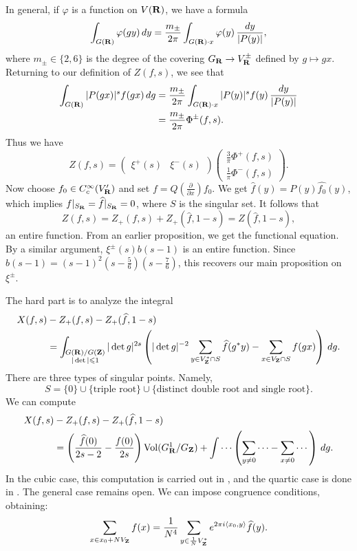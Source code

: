 In general, if $\varphi$ is a function on $V(\mathbf{R})$, we have a formula 
\[
  \int_{G(\mathbf{R})} \varphi(g y)\, dy = \frac{m_\pm}{2\pi} \int_{G(\mathbf{R})\cdot x} \varphi(y)\, \frac{dy}{|P(y)|} ,
\]
where $m_\pm\in \{2,6\}$ is the degree of the covering $G_{\mathbf{R}} \to V_{\mathbf{R}}^\pm$ 
defined by $g\mapsto g x$. Returning to our definition of $Z(f,s)$, we see that 
\begin{align*}
  \int_{G(\mathbf{R})} |P(g x)|^s f(g x)\, dg 
    &= \frac{m_\pm}{2\pi} \int_{G(\mathbf{R})\cdot x} |P(y)|^s f(y)\, \frac{dy}{|P(y)|} \\
    &= \frac{m_\pm}{2\pi} \Phi^\pm(f,s) .
\end{align*}
Thus we have 
\[
  Z(f,s) = \begin{pmatrix}\xi^+(s) & \xi^-(s)\end{pmatrix} \begin{pmatrix} \frac{3}{\pi} \Phi^+(f,s) \\ \frac{1}{\pi} \Phi^-(f,s) \end{pmatrix} . 
\]
Now choose $f_0\in C_c^\infty(V_{\mathbf{R}}')$ and set 
$f=Q(\frac{\partial}{\partial x}) f_0$. We get 
$\widehat f(y) = P(y) \widehat{f_0}(y)$, which implies 
$f|_{S_{\mathbf{R}}} = \widehat f|_{S_{\mathbf{R}}} = 0$, where $S$ is the singular set. It 
follows that 
\[
  Z(f,s) = Z_+(f,s) + Z_+(\widehat f,1-s) = Z(\widehat f,1-s) ,
\]
an entire function. From an earlier proposition, we get the functional 
equation. By a similar argument, $\xi^\pm(s) b(s-1)$ is an entire function. 
Since $b(s-1) = (s-1)^2 (s-\frac 5 6)(s-\frac 7 6)$, this recovers our main 
proposition on $\xi^\pm$. 

The hard part is to analyze the integral 
\begin{align*}
  X(f,s) &- Z_+(f,s) - Z_+(\widehat f,1-s) \\
    &= \int_{\substack{G(\mathbf{R})/G(\mathbf{Z}) \\ |\det|\leqslant 1}} |\det g|^{2 s} \left(|\det g|^{-2} \sum_{y\in V_{\mathbf{Z}}^\ast\cap S} \widehat f(g^\ast y) - \sum_{x\in V_{\mathbf{Z}}\cap S} f(g x)\right)\, dg .
\end{align*}
There are three types of singular points. Namely, 
\[
  S=\{0\} \cup \{\text{triple root}\}\cup \{\text{distinct double root and single root}\} .
\]
We can compute 
\begin{align*}
  X(f,s) &- Z_+(f,s) - Z_+(\widehat f,1-s) \\
    &= \left(\frac{\widehat f(0)}{2 s-2} - \frac{f(0)}{2 s}\right) \operatorname{Vol}(G_{\mathbf{R}}^1/G_{\mathbf{Z}}) + \int \cdots \left(\sum_{y\ne 0} \cdots - \sum_{x\ne 0} \cdots\right)\, dg .
\end{align*}
In the cubic case, this computation is carried out in \cite{s72}, and the 
quartic case is done in \cite{y92}. The general case remains open. We can 
impose congruence conditions, obtaining:  
\[
  \sum_{x\in x_0+N V_{\mathbf{Z}}} f(x) = \frac{1}{N^4}\sum_{y\in \frac 1 N V_{\mathbf{Z}}^\ast} e^{2\pi i\langle x_0,y\rangle} \widehat f(y) .
\]




